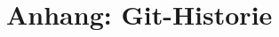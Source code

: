 \documentclass[usegeometry=true]{scrartcl}
\begin{document}

\tableofcontents
\clearpage















\newpage
\printbibliography

\newpage
\section*{Anhang: Git-Historie}
\end{document}
